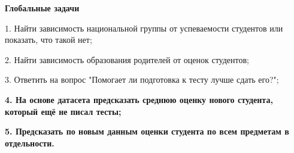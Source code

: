 \documentclass[12pt,a4paper]{article}
\begin{document}
\large \textbf{Глобальные задачи}

1. Найти зависимость национальной группы от успеваемости студентов или показать, что такой нет;

2. Найти зависимость образования родителей от оценок студентов;

3. Ответить на вопрос "Помогает ли подготовка к тесту лучше сдать его?";

\textbf{ 4. На основе датасета предсказать среднюю оценку нового студента, который ещё не писал тесты;}

\textbf{ 5. Предсказать по новым данным оценки студента по всем предметам в отдельности.}
\end{document}
